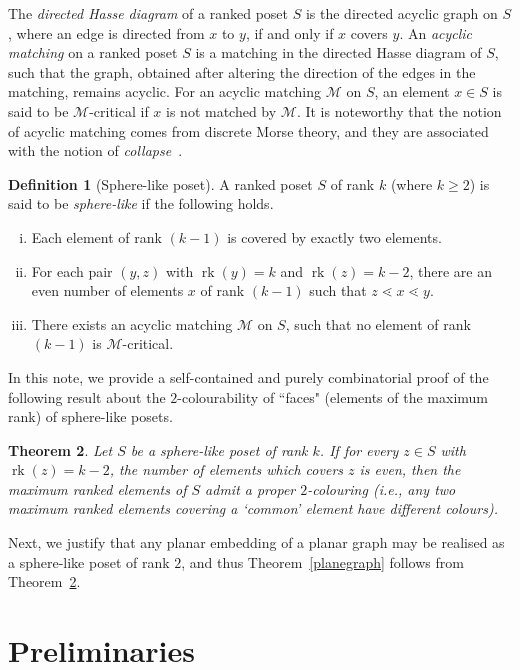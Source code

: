 \documentclass[12pt]{article}
\newtheorem{theorem}{Theorem}[section]
\theoremstyle{definition}
\newtheorem{definition}[theorem]{Definition}
\theoremstyle{remark}
\newcommand{\rk}{\operatorname{rk}}
\newcommand{\M}{\mathcal{M}}
\begin{document}
	The \emph{directed Hasse diagram} of a ranked poset $S$ is the directed acyclic graph on $S$, where an edge is directed from $x$ to $y$, if and only if $x$ covers $y$. An \emph{acyclic matching} on a ranked poset $S$ is a matching in the directed Hasse diagram of $S$, such that the graph, obtained after altering the direction of the edges in the matching, remains acyclic. For an acyclic matching $\M$ on $S$, an element $x\in S$ is said to be $\M$-critical if $x$ is not matched by $\M$. It is noteworthy that the notion of acyclic matching comes from discrete Morse theory\cite{chari}, and they are associated with the notion of \emph{collapse}~\cite{forman2002,forman1998,chari}.   
	 \begin{definition}[Sphere-like poset]
	 	A ranked poset $S$ of rank $k$ (where $k\geq 2$) is said to be \emph{sphere-like} if the following holds.
	 	\begin{enumerate}[(i)]
	 		\item Each element of rank $(k-1)$ is covered by exactly two elements.
	 		\item For each pair $(y,z)$ with $\rk(y)=k$ and $\rk(z)=k-2$, there are an even number of elements $x$ of rank $(k-1)$ such that $z \lessdot  x\lessdot y$.
	 		\item There exists an acyclic matching $\M$ on $S$, such that no element of rank $(k-1)$ is $\M$-critical.
	 	\end{enumerate}
	 \end{definition}
	 
	In this note, we provide a self-contained and purely combinatorial proof of the following result about the $2$-colourability of ``faces" (elements of the maximum rank) of sphere-like posets.
		\begin{theorem}\label{tmain}
			Let $S$ be a sphere-like poset of rank $k$. If for every $z\in S$ with $\rk(z)=k-2$, the number of elements which covers $z$ is even, then the maximum ranked elements of $S$ admit a proper $2$-colouring (i.e., any two maximum ranked elements covering a `common' element have different colours).
		\end{theorem}
    Next, we justify that any planar embedding of a planar graph may be realised as a sphere-like poset of rank $2$, and thus Theorem~\ref{planegraph} follows from Theorem~\ref{tmain}.
	\section{Preliminaries}
	
\end{document}
